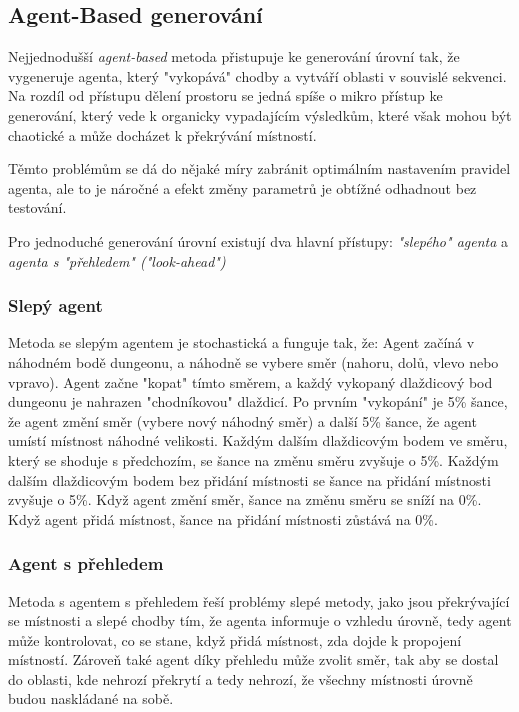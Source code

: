\subsection{Agent-Based generování}

Nejjednodušší \textit{agent-based} metoda přistupuje ke generování úrovní tak, že vygeneruje agenta, který "vykopává" chodby a vytváří oblasti v souvislé sekvenci. Na rozdíl od přístupu dělení prostoru se jedná spíše o mikro přístup ke generování, který vede k organicky vypadajícím výsledkům, které však mohou být chaotické a může docházet k překrývání místností. 

Těmto problémům se dá do nějaké míry zabránit optimálním nastavením pravidel agenta, ale to je náročné a efekt změny parametrů je obtížné odhadnout bez testování.

Pro jednoduché generování úrovní existují dva hlavní přístupy: \textit{"slepého" agenta} a \textit{agenta s "přehledem" ("look-ahead")}

\subsubsection{Slepý agent}
Metoda se slepým agentem je stochastická a funguje tak, že: Agent začíná v náhodném bodě dungeonu, a náhodně se vybere směr (nahoru, dolů, vlevo nebo vpravo). Agent začne "kopat" tímto směrem, a každý vykopaný dlaždicový bod dungeonu je nahrazen "chodníkovou" dlaždicí. Po prvním "vykopání" je 5\% šance, že agent změní směr (vybere nový náhodný směr) a další 5\% šance, že agent umístí místnost náhodné velikosti. Každým dalším dlaždicovým bodem ve směru, který se shoduje s předchozím, se šance na změnu směru zvyšuje o 5\%. Každým dalším dlaždicovým bodem bez přidání místnosti se šance na přidání místnosti zvyšuje o 5\%. Když agent změní směr, šance na změnu směru se sníží na 0\%. Když agent přidá místnost, šance na přidání místnosti zůstává na 0\%.

\subsubsection{Agent s přehledem}
Metoda s agentem s přehledem řeší problémy slepé metody, jako jsou překrývající se místnosti a slepé chodby tím, že agenta informuje o vzhledu úrovně, tedy agent může kontrolovat, co se stane, když přidá místnost, zda dojde k propojení místností. Zároveň také agent díky přehledu může zvolit směr, tak aby se dostal do oblasti, kde nehrozí překrytí a tedy nehrozí, že všechny místnosti úrovně budou naskládané na sobě. \cite{PCGclanek}
